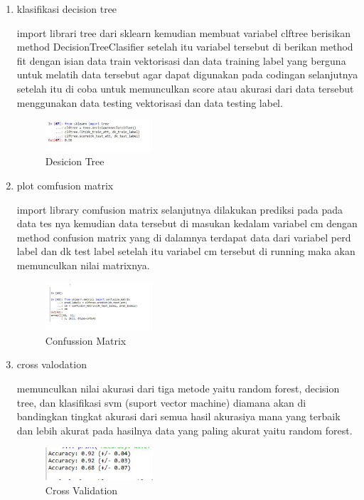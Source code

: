 \begin{enumerate}
        \item klasifikasi decision tree \hfill \break 
        
        import librari tree dari sklearn kemudian membuat variabel clftree berisikan method DecisionTreeClasifier setelah itu variabel tersebut di berikan method fit dengan isian data train vektorisasi dan data training label yang berguna untuk melatih data tersebut agar dapat digunakan pada codingan selanjutnya setelah itu di coba untuk memunculkan score atau akurasi dari data tersebut menggunakan data testing vektorisasi dan data testing label.
        \begin{figure}[H]
            \includegraphics[width=4cm]{figures/1174003/4/5.jpg}
            \centering
            \caption{Desicion Tree}
        \end{figure}

        \item plot comfusion matrix \hfill \break 
        
        import library comfusion matrix selanjutnya dilakukan prediksi pada pada data tes nya kemudian data tersebut di masukan kedalam variabel cm dengan method confusion matrix yang di dalamnya terdapat data dari variabel perd label dan dk test label setelah itu variabel cm tersebut di running maka akan memunculkan nilai matrixnya. 
        \begin{figure}[H]
            \includegraphics[width=4cm]{figures/1174003/4/6.jpg}
            \centering
            \caption{Confussion Matrix}
        \end{figure}

        \item cross valodation \hfill \break 
        
        memunculkan nilai akurasi dari tiga metode yaitu random forest, decision tree, dan klasifikasi svm (suport vector machine) diamana akan di bandingkan tingkat akurasi dari semua hasil akurasiya mana yang terbaik dan lebih akurat pada hasilnya data yang paling akurat yaitu random forest.
        \begin{figure}[H]
            \includegraphics[width=4cm]{figures/1174003/4/7.jpg}
            \centering
            \caption{Cross Validation}
        \end{figure}


\end{enumerate}
